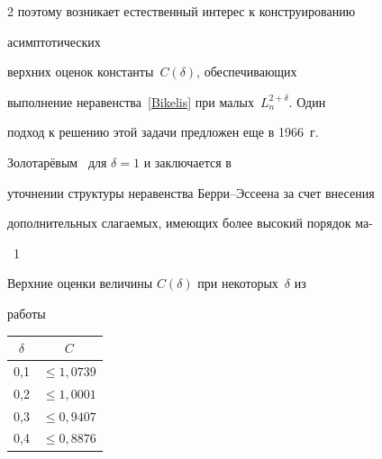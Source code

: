 \begin{multicols}{2}
поэтому возникает естественный интерес к конструированию {\it


асимптотических} верхних оценок константы~$C(\delta)$, обеспечивающих


выполнение неравенства~\eqref{Bikelis} при малых~$L_n^{2+\delta}$. Один


подход к решению этой задачи предложен еще в 1966~г.\


Золотарёвым~\cite{Zolotarev1966} для $\delta=1$ и заключается в


уточнении структуры неравенства Берри--Эссеена за счет внесения


дополнительных  слагаемых, имеющих более высокий порядок ма-\linebreak\vspace*{-12pt}


\columnbreak








\noindent %


\begin{center}


\parbox{38mm}{{\tablename~1}\ \ \small{Верхние оценки величины $C(\delta)$ при некоторых~$\delta$ из


работы~\cite{GaponovaKorchaginShevtsova2009}}}


\end{center}


\vspace*{6pt}





{\small


\begin{center}


\tabcolsep=15pt


\begin{tabular}{|c|c|}


 \hline


$\delta$& $C$\\


\hline


0,1& $\le 1{,}0739$\\


0,2& $\le 1{,}0001$\\


0,3& $\le 0{,}9407$\\


0,4& $\le 0{,}8876$\\



\end{tabular}
\end{center}}
\end{multicols}
